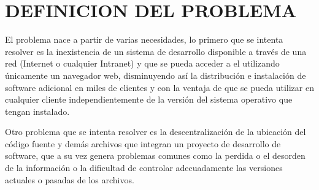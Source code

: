 \section{DEFINICION DEL PROBLEMA}

El problema nace a partir de varias necesidades, lo primero que se intenta resolver es la inexistencia de un sistema de desarrollo disponible a través de una red (Internet o cualquier Intranet) y que se pueda acceder a el utilizando únicamente un navegador web, disminuyendo así la distribución e instalación de software adicional en miles de clientes y con la ventaja de que se pueda utilizar en cualquier cliente independientemente de la versión del sistema operativo que tengan instalado.

Otro problema que se intenta resolver es la descentralización de la ubicación del código fuente y demás archivos que integran un proyecto de desarrollo de software, que a su vez genera problemas comunes como la perdida o el desorden de la información o la dificultad de controlar adecuadamente las versiones actuales o pasadas de los archivos.
